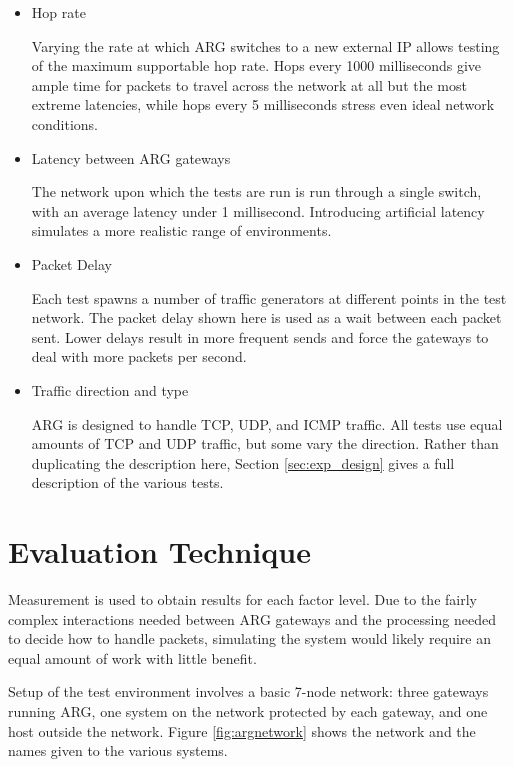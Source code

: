 \begin{itemize}
\item Hop rate
	\par Varying the rate at which \ac{ARG} switches to a new external \ac{IP} allows testing of the maximum supportable hop rate. Hops every 1000 milliseconds give ample time for packets to travel across the network at all but the most extreme latencies, while hops every 5 milliseconds stress even ideal network conditions.

\item Latency between \ac{ARG} gateways
	\par The network upon which the tests are run is run through a single switch, with an average latency under 1 millisecond. Introducing artificial latency simulates a more realistic range of environments.

\item Packet Delay
	\par Each test spawns a number of traffic generators at different points in the test network. The packet delay shown here is used as a wait between each packet sent. Lower delays result in more frequent sends and force the gateways to deal with more packets per second.

\item Traffic direction and type
	\par \ac{ARG} is designed to handle \ac{TCP}, \ac{UDP}, and \ac{ICMP} traffic. All tests use equal amounts of \ac{TCP} and \ac{UDP} traffic, but some vary the direction. Rather than duplicating the description here, Section \ref{sec:exp_design} gives a full description of the various tests.
\end{itemize}

\section{Evaluation Technique}
\label{sec:eval_technique}
\par Measurement is used to obtain results for each factor level. Due to the fairly complex interactions needed between \ac{ARG} gateways and the processing needed to decide how to handle packets, simulating the system would likely require an equal amount of work with little benefit.

\par Setup of the test environment involves a basic 7-node network: three gateways running \ac{ARG}, one system on the network protected by each gateway, and one host outside the network. Figure \ref{fig:argnetwork} shows the network and the names given to the various systems.

